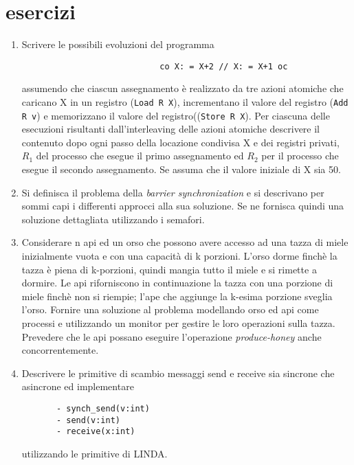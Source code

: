 \chapter{esercizi}

\begin{enumerate}
\medskip
\item 
Scrivere le possibili evoluzioni del programma 
\begin{verbatim}
                       		co X: = X+2 // X: = X+1 oc
\end{verbatim}
assumendo che ciascun assegnamento è realizzato da tre azioni atomiche che
caricano X in un registro (\verb"Load R X"), incrementano il valore del registro (\verb"Add R v") e memorizzano il valore del registro((\verb"Store R X"). Per ciascuna delle esecuzioni risultanti dall'interleaving delle azioni atomiche descrivere il contenuto dopo ogni passo della locazione condivisa X e dei registri privati,  $R_1$ del processo che esegue il primo assegnamento ed  $R_2$  per il processo che esegue il secondo assegnamento. Se assuma che il valore iniziale di X sia 50.
\medskip
\item
Si definisca il problema della \emph{barrier synchronization} e si descrivano per sommi capi i differenti approcci alla sua soluzione. Se ne fornisca quindi una soluzione dettagliata utilizzando i semafori.
\medskip
\item
Considerare n api ed un orso che possono avere accesso ad una tazza di miele
inizialmente  vuota e con una capacità di k porzioni. L'orso dorme finchè la
tazza è piena di k-porzioni,  quindi mangia tutto il miele e si rimette a
dormire. Le api riforniscono in continuazione la  tazza con una porzione di
miele finchè non si riempie; l'ape che aggiunge la k-esima porzione sveglia
l'orso. Fornire una soluzione al problema modellando orso ed api come  processi
e utilizzando un monitor per gestire le loro operazioni sulla tazza. Prevedere che le api possano eseguire l'operazione \emph{produce-honey} anche concorrentemente.
 \medskip
 \item  Descrivere le primitive di scambio messaggi send e receive sia sincrone che asincrone ed implementare
 \vspace{-0.5cm}
 \begin{verbatim}
       - synch_send(v:int)
       - send(v:int)
       - receive(x:int)
\end{verbatim}
 \vspace{-0.3cm}
utilizzando le primitive di LINDA.

\end{enumerate}
